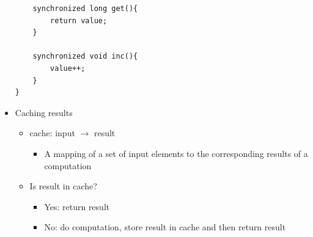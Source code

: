 \documentclass[a4paper]{article}
\begin{document}
\begin{itemize}
\begin{lstlisting}
	synchronized long get(){
		return value;
	}

	synchronized void inc(){
		value++;
	}
}
 			\end{lstlisting}
 			\item Caching results
 				\begin{itemize}
 					\item cache: input $\to$ result
 						\begin{itemize}
 							\item A mapping of a set of input elements to the corresponding results of a computation
 						\end{itemize}
 					\item Is result in cache?
 						\begin{itemize}
 							\item Yes: return result
 							\item No: do computation, store result in cache and then return result
 						\end{itemize}
 				\end{itemize}
	\end{itemize}
\end{document}
